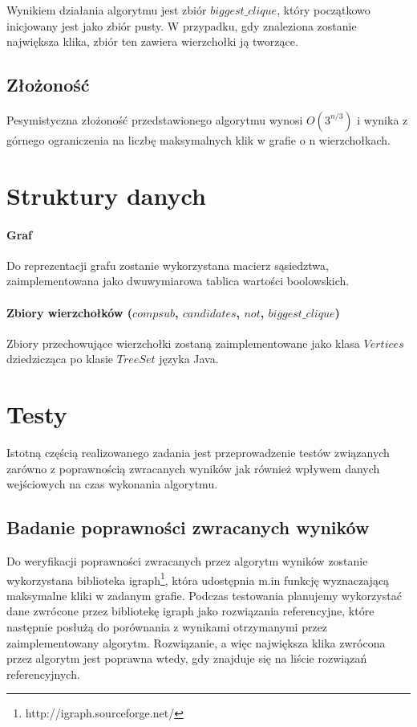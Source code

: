 \documentclass[12pt, a4paper]{article}
\begin{document}
Wynikiem działania algorytmu jest zbiór $biggest\_clique$, który początkowo inicjowany jest jako zbiór pusty. W przypadku, gdy znaleziona zostanie największa klika, zbiór ten zawiera wierzchołki ją tworzące.

\subsection{Złożoność}
Pesymistyczna złożoność przedstawionego algorytmu wynosi $O(3^{n/3})$ i wynika z górnego ograniczenia na liczbę maksymalnych klik w grafie o n wierzchołkach.

\section{Struktury danych}
\paragraph{Graf}
Do reprezentacji grafu zostanie wykorzystana macierz sąsiedztwa, zaimplementowana jako dwuwymiarowa tablica wartości boolowskich.

\paragraph{Zbiory wierzchołków ($compsub$, $candidates$, $not$, $biggest\_clique$)}
Zbiory przechowujące wierzchołki zostaną zaimplementowane jako klasa $Vertices$ dziedzicząca po klasie $TreeSet$ języka Java.

\section{Testy}
Istotną częścią realizowanego zadania jest przeprowadzenie testów związanych zarówno z poprawnością zwracanych wyników jak również wpływem danych wejściowych na czas wykonania algorytmu.

\subsection{Badanie poprawności zwracanych wyników}
\label{igraph-testy}
Do weryfikacji poprawności zwracanych przez algorytm wyników zostanie wykorzystana biblioteka igraph\footnote{http://igraph.sourceforge.net/}, która udostępnia m.in funkcję wyznaczającą maksymalne kliki w zadanym grafie. Podczas testowania planujemy wykorzystać dane zwrócone przez bibliotekę igraph jako rozwiązania referencyjne, które następnie posłużą do porównania z wynikami otrzymanymi przez zaimplementowany algorytm. Rozwiązanie, a więc największa klika zwrócona przez algorytm jest poprawna wtedy, gdy znajduje się na liście rozwiązań referencyjnych.
\end{document}
